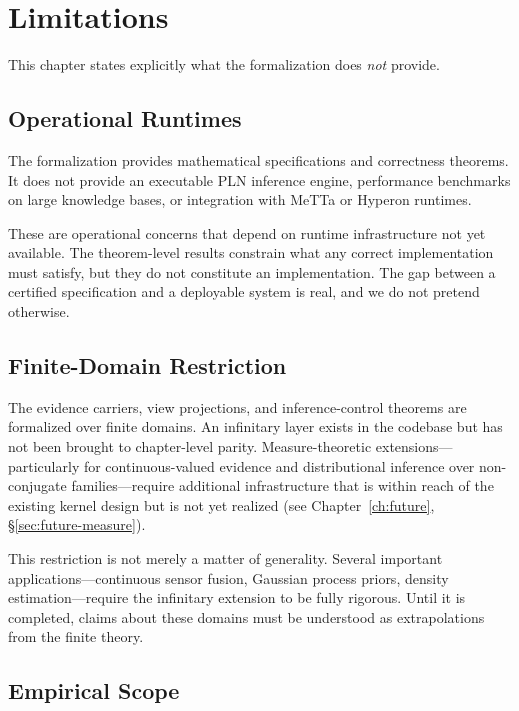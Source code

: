 \chapter{Limitations}
\label{ch:limitations}

This chapter states explicitly what the formalization does \emph{not}
provide.

\section{Operational Runtimes}

The formalization provides mathematical specifications and correctness
theorems.  It does not provide an executable PLN inference engine,
performance benchmarks on large knowledge bases, or integration with
MeTTa or Hyperon runtimes.

These are operational concerns that depend on runtime infrastructure
not yet available.  The theorem-level results constrain what any
correct implementation must satisfy, but they do not constitute an
implementation.  The gap between a certified specification and a
deployable system is real, and we do not pretend otherwise.

\section{Finite-Domain Restriction}

The evidence carriers, view projections, and inference-control
theorems are formalized over finite domains.  An infinitary layer
exists in the codebase but has not been brought to chapter-level
parity.  Measure-theoretic extensions---particularly for
continuous-valued evidence and distributional inference over
non-conjugate families---require additional infrastructure that is
within reach of the existing kernel design but is not yet realized
(see Chapter~\ref{ch:future}, \S\ref{sec:future-measure}).

This restriction is not merely a matter of generality.  Several
important applications---continuous sensor fusion, Gaussian process
priors, density estimation---require the infinitary extension to be
fully rigorous.  Until it is completed, claims about these domains
must be understood as extrapolations from the finite theory.

\section{Empirical Scope}

